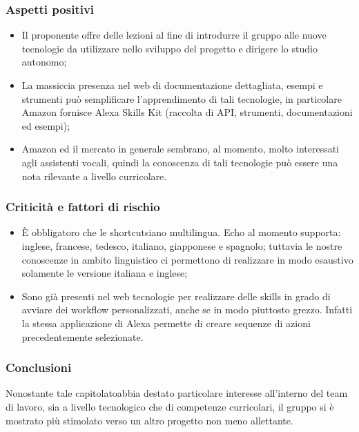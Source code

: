 \subsubsection{Aspetti positivi}
\begin{itemize}
    \item Il proponente offre delle lezioni al fine di introdurre il gruppo alle 
nuove tecnologie da utilizzare nello sviluppo del progetto e dirigere lo studio 
autonomo;
    \item La massiccia presenza nel web di documentazione dettagliata, esempi e 
strumenti può semplificare l'apprendimento di tali tecnologie, in 
particolare Amazon fornisce Alexa Skills Kit (raccolta di API, 
strumenti, documentazioni ed esempi);
    \item Amazon ed il mercato in generale sembrano, al momento, molto interessati 
agli assistenti vocali, quindi la conoscenza di tali tecnologie può essere una 
nota rilevante a livello curricolare.
\end{itemize}
\subsubsection{Criticità e fattori di rischio}
\begin{itemize}
    \item \`E obbligatoro che le shortcut\glosp siano multilingua. Echo al momento 
supporta: inglese, francese, tedesco, italiano, giapponese e spagnolo; tuttavia 
le nostre conoscenze in ambito linguistico ci permettono di realizzare in modo 
esaustivo solamente le versione italiana e inglese;
    \item Sono già presenti nel web tecnologie per realizzare delle skills\glo{} in 
    grado di avviare dei workflow\glo{} personalizzati, anche se in modo piuttosto grezzo.
    Infatti la stessa applicazione di Alexa permette di creare sequenze di azioni precedentemente 
selezionate.
 
\end{itemize}
\subsubsection{Conclusioni}
Nonostante tale capitolato\glosp abbia destato particolare interesse all'interno del 
team di lavoro, sia a livello tecnologico che di competenze curricolari, il 
gruppo si è mostrato più stimolato verso un altro progetto non meno allettante.


